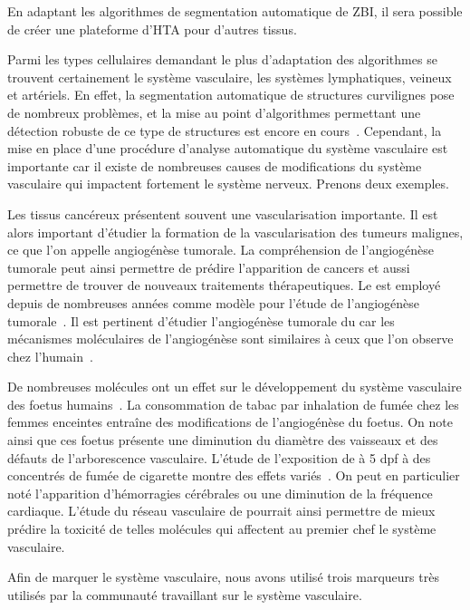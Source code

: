 \documentclass[\main/main.tex]{subfiles}
\begin{document}
%
En adaptant les algorithmes de segmentation automatique de ZBI,
il sera possible de créer une plateforme d'HTA pour d'autres tissus.

Parmi les types cellulaires demandant le plus d'adaptation des algorithmes se trouvent certainement le système vasculaire, les systèmes lymphatiques, veineux et artériels.
%
En effet,
la segmentation automatique de structures curvilignes pose de nombreux problèmes,
et la mise au point d'algorithmes permettant une détection robuste de ce type de
structures est encore en cours~\cite{merveille_2019,mosinska_2020,mou_2019}.
%
Cependant, la mise en place d'une procédure d'analyse automatique du système vasculaire est importante car il existe de nombreuses causes de modifications du système vasculaire qui impactent fortement le système nerveux.
%
Prenons deux exemples.

%
Les tissus cancéreux présentent souvent une vascularisation importante.
%
Il est alors important d'étudier la formation de la vascularisation des tumeurs malignes, ce que l'on appelle angiogénèse tumorale.
%
La compréhension de l'angiogénèse tumorale peut ainsi permettre de prédire
l'apparition de cancers et aussi permettre de trouver de nouveaux traitements
thérapeutiques.
%
Le \pz{} est employé depuis de nombreuses années comme modèle pour l'étude de l'angiogénèse tumorale~\cite{nicoli_2007,guerra_2020,letrado_2018}.
%
Il est pertinent d'étudier l'angiogénèse tumorale du \pz{} car les mécanismes moléculaires de l'angiogénèse sont similaires à ceux que l'on observe chez l'humain~\cite{tobia_2011}.

%
De nombreuses molécules ont un effet sur le développement du système vasculaire des foetus humains~\cite{knudsen_2011}.
%
La consommation de tabac par inhalation de fumée chez les femmes enceintes
entraîne des modifications de l'angiogénèse du foetus.
%
On note ainsi que ces foetus présente une diminution du diamètre des vaisseaux
et des défauts de l'arborescence vasculaire.
%
L'étude de l'exposition de \pz{} à 5 dpf à des concentrés de fumée de cigarette
montre des effets variés~\cite{ellis_2014,massarsky_2018}.
%
On peut en particulier noté l'apparition d'hémorragies cérébrales ou une diminution de la fréquence cardiaque.
%
L'étude du réseau vasculaire de \pz{} pourrait ainsi permettre de mieux prédire la toxicité de telles molécules qui affectent au premier chef le système vasculaire.%

%
Afin de marquer le système vasculaire, nous avons utilisé trois marqueurs très utilisés par la communauté \pz{} travaillant sur le système vasculaire.
%
\end{document}
